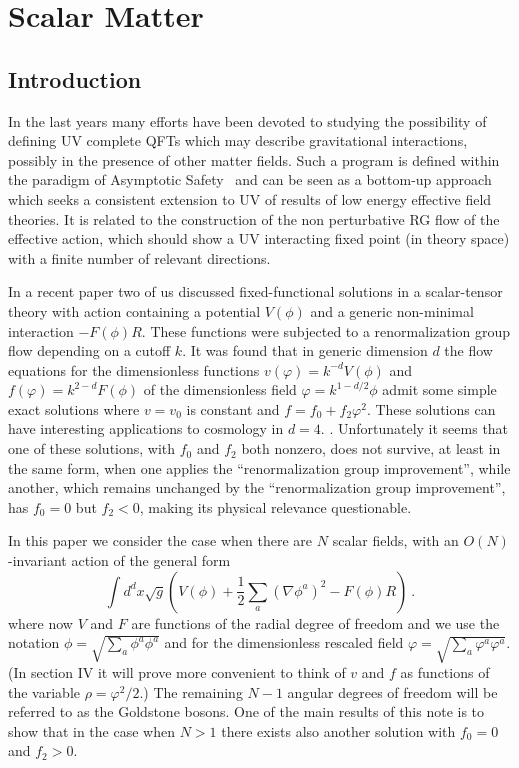 \documentclass[11pt]{book} %
\newcommand{\be}{\begin{equation}}
\newcommand{\ee}{\end{equation}}
\begin{document}

\chapter{Scalar Matter}

\section{Introduction}

In the last years many efforts have been devoted to studying the possibility of defining UV complete QFTs
which may describe gravitational interactions,
possibly in the presence of other matter fields.
Such a program is defined within the paradigm of Asymptotic Safety~\cite{W1} and can be seen as a bottom-up approach which seeks a consistent extension
to UV of results of low energy effective field theories.
It is related to the construction of the non perturbative RG flow of the effective action, which should show a UV interacting fixed point (in theory space) with a finite number of relevant directions.

In a recent paper \cite{pv1} two of us discussed
fixed-functional solutions
in a scalar-tensor theory with action containing a potential $V(\phi)$
and a generic non-minimal interaction $-F(\phi)R$.
These functions were subjected to a renormalization group flow
depending on a cutoff $k$.
It was found that in generic dimension $d$ the flow equations for the dimensionless
functions $v(\varphi)=k^{-d}V(\phi)$ and $f(\varphi)=k^{2-d}F(\phi)$
of the dimensionless field $\varphi=k^{1-d/2}\phi$
admit some simple exact solutions where $v=v_0$ is constant and
$f=f_0+f_2\varphi^2$.
These solutions can have interesting applications to cosmology in $d=4$.
\cite{hprw}.
Unfortunately it seems that one of these solutions,
with $f_0$ and $f_2$ both nonzero, does not survive,
at least in the same form, when one applies the
``renormalization group improvement'',
while another, which remains unchanged by the
``renormalization group improvement'',
has $f_0=0$ but $f_2<0$, making its physical relevance questionable.

In this paper we consider the case when
there are $N$ scalar fields, with an $O(N)$-invariant
action of the general form
\be
\label{action}
\int d^dx\sqrt{g}\left(V(\phi)
+\frac{1}{2}\sum_a(\nabla\phi^a)^2-F(\phi)R\right)\ .
\ee
where now $V$ and $F$ are functions of the radial degree of freedom
and we use the notation $\phi=\sqrt{\sum_a \phi^a\phi^a}$ and for the dimensionless rescaled field
$\varphi=\sqrt{\sum_a \varphi^a\varphi^a}$.
(In section IV it will prove more convenient to think of
$v$ and $f$ as functions of the variable $\rho=\varphi^2/2$.)
The remaining $N-1$ angular degrees
of freedom will be referred to as the Goldstone bosons.
One of the main results of this note is to show that in the case
when $N>1$ there exists also another solution with $f_0=0$ and $f_2>0$.
\end{document}
